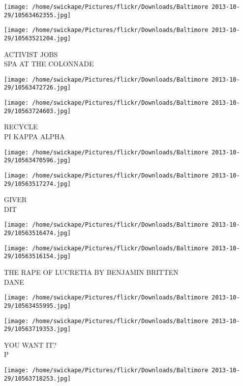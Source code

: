 \documentclass[10pt,letterpaper]{article}
\begin{document}
\texttt{[image: /home/swickape/Pictures/flickr/Downloads/Baltimore 2013-10-29/10563462355.jpg]}

\vspace{0.25in}
\texttt{[image: /home/swickape/Pictures/flickr/Downloads/Baltimore 2013-10-29/10563521204.jpg]}

ACTIVIST JOBS\\
SPA AT THE COLONNADE
\pagebreak

\texttt{[image: /home/swickape/Pictures/flickr/Downloads/Baltimore 2013-10-29/10563472726.jpg]}

\vspace{0.25in}
\texttt{[image: /home/swickape/Pictures/flickr/Downloads/Baltimore 2013-10-29/10563724603.jpg]}

RECYCLE\\
PI KAPPA ALPHA
\pagebreak

\texttt{[image: /home/swickape/Pictures/flickr/Downloads/Baltimore 2013-10-29/10563470596.jpg]}

\vspace{0.25in}
\texttt{[image: /home/swickape/Pictures/flickr/Downloads/Baltimore 2013-10-29/10563517274.jpg]}

GIVER\\
DIT
\pagebreak

\texttt{[image: /home/swickape/Pictures/flickr/Downloads/Baltimore 2013-10-29/10563516474.jpg]}

\vspace{0.25in}
\texttt{[image: /home/swickape/Pictures/flickr/Downloads/Baltimore 2013-10-29/10563516154.jpg]}

THE RAPE OF LUCRETIA BY BENJAMIN BRITTEN\\
DANE
\pagebreak

\texttt{[image: /home/swickape/Pictures/flickr/Downloads/Baltimore 2013-10-29/10563455995.jpg]}

\vspace{0.25in}
\texttt{[image: /home/swickape/Pictures/flickr/Downloads/Baltimore 2013-10-29/10563719353.jpg]}

YOU WANT IT?\\
P
\pagebreak

\texttt{[image: /home/swickape/Pictures/flickr/Downloads/Baltimore 2013-10-29/10563718253.jpg]}
\end{document}
